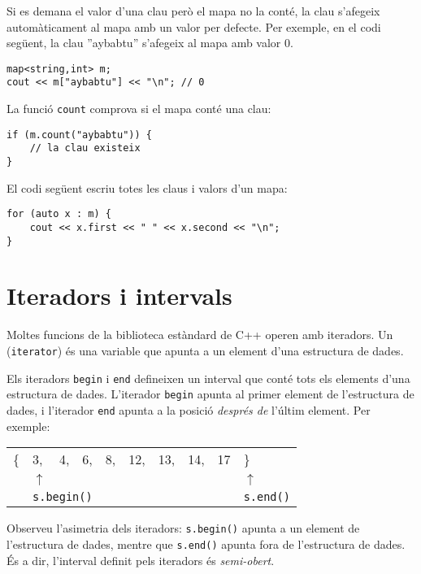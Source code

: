 Si es demana el valor d'una clau
però el mapa no la conté,
la clau s'afegeix automàticament al mapa amb
un valor per defecte.
Per exemple, en el codi següent,
la clau ''aybabtu'' s'afegeix al mapa
amb valor 0.

\begin{lstlisting}
map<string,int> m;
cout << m["aybabtu"] << "\n"; // 0
\end{lstlisting}
La funció \texttt{count} comprova
si el mapa conté una clau:
\begin{lstlisting}
if (m.count("aybabtu")) {
    // la clau existeix
}
\end{lstlisting}
El codi següent escriu totes les claus i valors
d'un mapa:
\begin{lstlisting}
for (auto x : m) {
    cout << x.first << " " << x.second << "\n";
}
\end{lstlisting}

\section{Iteradors i intervals}


Moltes funcions de la biblioteca estàndard de C++
operen amb iteradors.
Un  (\texttt{iterator}) és una variable que
apunta a un element d'una estructura de dades.

Els iteradors \texttt{begin}
i \texttt{end} defineixen un interval que conté
tots els elements d'una estructura de dades.
L'iterador \texttt{begin} apunta
al primer element de l'estructura de dades,
i l'iterador \texttt{end} apunta
a la posició \emph{després de} l'últim element.
Per exemple:

\begin{center}
\begin{tabular}{llllllllll}
\{ & 3, & 4, & 6, & 8, & 12, & 13, & 14, & 17 & \} \\
& $\uparrow$ & & & & & & & & $\uparrow$ \\
& \multicolumn{3}{l}{\texttt{s.begin()}} & & & & & & \texttt{s.end()} \\
\end{tabular}
\end{center}

Observeu l'asimetria dels iteradors:
\texttt{s.begin()} apunta a un element de l'estructura de dades,
mentre que \texttt{s.end()} apunta fora de l'estructura de dades.
És a dir, l'interval definit pels iteradors és \emph{semi-obert}.

